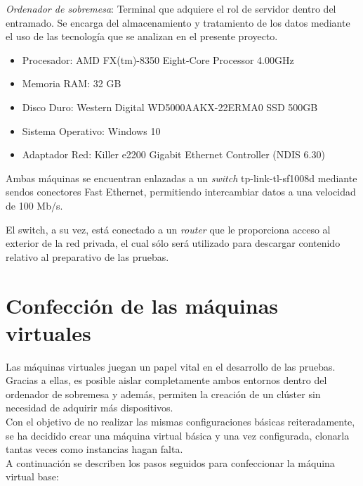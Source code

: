 \textit{Ordenador de sobremesa}: Terminal que adquiere el rol de servidor dentro del entramado. Se encarga del almacenamiento y tratamiento de los datos mediante el uso de las tecnología que se analizan en el presente proyecto.\\

\begin{itemize}
	\item Procesador: AMD FX(tm)-8350 Eight-Core Processor 4.00GHz
	\item Memoria RAM: 32 GB
	\item Disco Duro: Western Digital WD5000AAKX-22ERMA0 SSD 500GB
	\item Sistema Operativo: Windows 10
	\item Adaptador Red: Killer e2200 Gigabit Ethernet Controller (NDIS 6.30)
\end{itemize}

Ambas máquinas se encuentran enlazadas a un \textit{switch} tp-link-tl-sf1008d mediante sendos conectores Fast Ethernet, permitiendo intercambiar datos a una velocidad de 100 Mb/s.

El switch,  a su vez, está conectado a un \textit{router} que le proporciona acceso al exterior de la red privada, el cual sólo será utilizado para descargar contenido relativo al preparativo de las pruebas.\\ 

\section{Confección de las máquinas virtuales}

Las máquinas virtuales juegan un papel vital en el desarrollo de las pruebas. Gracias a ellas, es posible aislar completamente ambos entornos dentro del ordenador de sobremesa y además, permiten la creación de un clúster sin necesidad de adquirir más dispositivos.\\
 
Con el objetivo de no realizar las mismas configuraciones básicas reiteradamente, se ha decidido crear una máquina virtual básica y una vez configurada, clonarla tantas veces como instancias hagan falta.\\

A continuación se describen los pasos seguidos para confeccionar la máquina virtual base:\\

